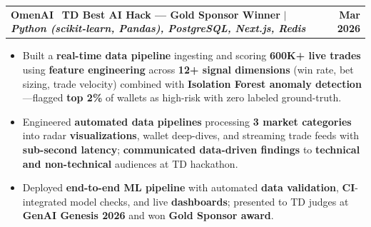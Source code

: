 \documentclass[letterpaper,10pt]{article}
\makeatletter
\newcommand{\resumeItem}[1]{
  \item\small{
    {#1 \vspace{-1pt}}
  }
}
\newcommand{\resumeProjectHeading}[2]{
    \item
    \begin{tabular*}{1.001\textwidth}{l@{\extracolsep{\fill}}r}
      \small#1 & \textbf{\small #2}\\
    \end{tabular*}\vspace{-9pt}
}
\newcommand{\resumeItemListStart}{\begin{itemize}[leftmargin=0.15in, topsep=1pt, itemsep=0.5pt, parsep=0pt, partopsep=0pt]}
\newcommand{\resumeItemListEnd}{\end{itemize}\vspace{0pt}}
\makeatother
\begin{document}
    \resumeProjectHeading
          {\textbf{OmenAI} \textbar\ \textbf{TD Best AI Hack --- Gold Sponsor Winner} $|$ \emph{\textbf{Python (scikit-learn, Pandas), PostgreSQL, Next.js, Redis}}}{Mar 2026}
    \resumeItemListStart
    \resumeItem{Built a \textbf{real-time data pipeline} ingesting and scoring \textbf{600K+ live trades} using \textbf{feature engineering} across \textbf{12+ signal dimensions} (win rate, bet sizing, trade velocity) combined with \textbf{Isolation Forest anomaly detection}---flagged \textbf{top 2\%} of wallets as high-risk with zero labeled ground-truth.}
    \vspace{-2pt}
    \resumeItem{Engineered \textbf{automated data pipelines} processing \textbf{3 market categories} into radar \textbf{visualizations}, wallet deep-dives, and streaming trade feeds with \textbf{sub-second latency}; \textbf{communicated data-driven findings} to \textbf{technical and non-technical} audiences at TD hackathon.}
    \vspace{-2pt}
    \resumeItem{Deployed \textbf{end-to-end ML pipeline} with automated \textbf{data validation}, \textbf{CI}-integrated model checks, and live \textbf{dashboards}; presented to TD judges at \textbf{GenAI Genesis 2026} and won \textbf{Gold Sponsor award}.}
          \resumeItemListEnd
      \vspace{-4pt}
\end{document}
